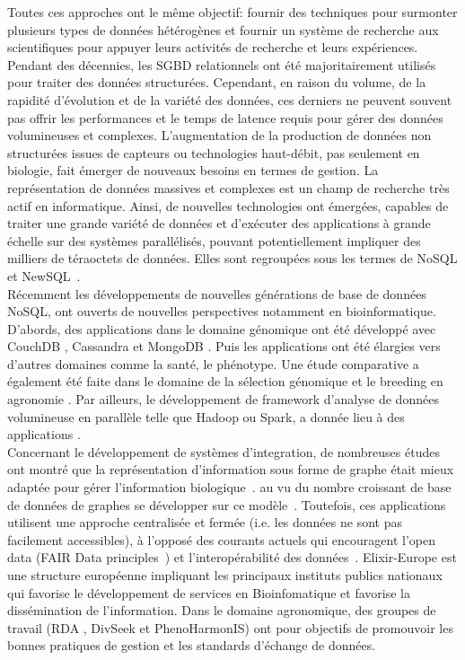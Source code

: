 Toutes ces approches ont le même objectif: fournir des techniques pour surmonter plusieurs types de données hétérogènes et fournir un système de recherche aux scientifiques pour appuyer leurs activités de recherche et leurs expériences.
Pendant des décennies, les SGBD relationnels ont été majoritairement utilisés pour traiter des données structurées. Cependant, en raison du volume, de la rapidité d'évolution et de la variété des données, ces derniers ne peuvent souvent pas offrir les performances et le temps de latence requis pour gérer des données volumineuses et complexes. L'augmentation de la production de données non structurées issues de capteurs ou technologies haut-débit, pas seulement en biologie, fait émerger de nouveaux besoins en termes de gestion. La représentation de données massives et complexes est un champ de recherche très actif en informatique. Ainsi, de nouvelles technologies ont émergées, capables de traiter une grande variété de données et d’exécuter des applications à grande échelle sur des systèmes parallélisés, pouvant potentiellement impliquer des milliers de téraoctets de données. Elles sont regroupées sous les termes de NoSQL et NewSQL~\cite{Gajendran2012, Grolinger2013,MoniruzzamanH13}.\\

Récemment les développements de nouvelles générations de base de données NoSQL, ont ouverts de nouvelles perspectives notamment en bioinformatique. D'abords, des applications dans le domaine génomique ont été développé avec CouchDB \cite{Manyam2012,Aniceto2015}, Cassandra \cite{Gabetta2015} et MongoDB \cite{Sempere2016}. Puis les applications ont été élargies vers d'autres domaines comme la santé, le phénotype. Une étude comparative a également été faite dans le domaine de la sélection génomique et le breeding en agronomie \cite{benchmarking2019}. Par ailleurs, le développement de framework d'analyse de données volumineuse en parallèle telle que Hadoop ou Spark, a donnée lieu à des applications \cite{Schumacher2014,Nordberg2013,Taylor2010}.\\

 Concernant le développement de systèmes d'integration, de nombreuses études ont montré que la représentation d’information sous forme de graphe était mieux adaptée pour gérer l’information biologique~\cite{Have2013,Lysenko2016}.  au vu du nombre croissant de base de données de graphes se développer sur ce modèle~\cite{Hassani-Pak2016,Pareja-tobes2015}. Toutefois, ces applications utilisent une approche centralisée et fermée (i.e. les données ne sont pas facilement accessibles), à l’opposé des courants actuels qui encouragent l’open data (FAIR Data principles~\cite{Wilkinson2016a}) et l’interopérabilité des données~\cite{DzaleYeumo2017,Leonelli2017}. Elixir-Europe est une structure européenne impliquant les principaux instituts publics nationaux qui favorise le développement de services en Bioinfomatique et favorise la dissémination de l’information. Dans le domaine agronomique, des groupes de travail (RDA , DivSeek et PhenoHarmonIS) ont pour objectifs de promouvoir les bonnes pratiques de gestion et les standards d’échange de données.\\

